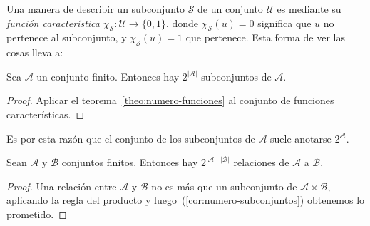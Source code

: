   Una manera de describir un subconjunto \(\mathcal{S}\)
  de un conjunto \(\mathcal{U}\)
  es mediante su \emph{función característica}%
  \(\chi_{\mathcal{S}} \colon \mathcal{U} \rightarrow \{0, 1\}\),
  donde \(\chi_{\mathcal{S}}(u) = 0\)
  significa que \(u\) no pertenece al subconjunto,
  y \(\chi_{\mathcal{S}}(u) = 1\) que pertenece.
  Esta forma de ver las cosas lleva a:
  \begin{corollary}
    \label{cor:numero-subconjuntos}
    Sea \(\mathcal{A}\) un conjunto finito.
    Entonces hay \(2^{\lvert \mathcal{A} \rvert}\)
    subconjuntos de \(\mathcal{A}\).
  \end{corollary}
  \begin{proof}
    Aplicar el teorema~\ref{theo:numero-funciones}
    al conjunto de funciones características.
  \end{proof}
  Es por esta razón que el conjunto
  de los subconjuntos de \(\mathcal{A}\)
  suele anotarse \(2^{\mathcal{A}}\).
  \begin{corollary}
    \label{cor:numero-relaciones}
    Sean \(\mathcal{A}\) y \(\mathcal{B}\) conjuntos finitos.
    Entonces hay \(2^{\lvert \mathcal{A} \rvert
		      \cdot \lvert \mathcal{B} \rvert}\)
    relaciones de \(\mathcal{A}\) a \(\mathcal{B}\).
  \end{corollary}
  \begin{proof}
    Una relación entre \(\mathcal{A}\) y \(\mathcal{B}\)
    no es más que un subconjunto
    de \(\mathcal{A} \times \mathcal{B}\),
    aplicando la regla del producto
    y luego~(\ref{cor:numero-subconjuntos}) obtenemos lo prometido.
  \end{proof}

